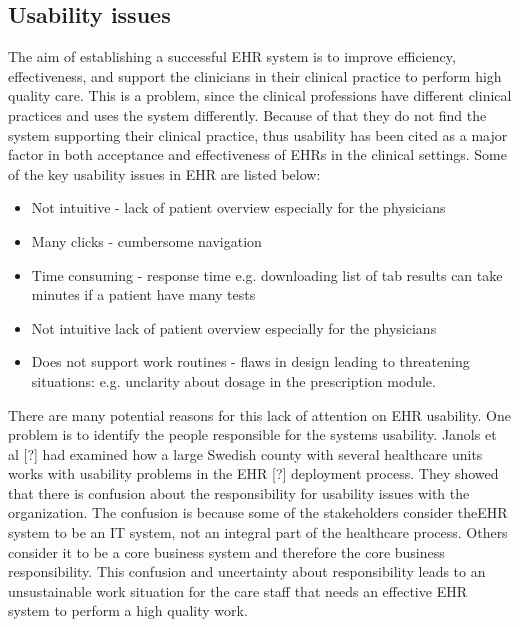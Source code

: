 \documentclass[14pt]{article}
\begin{document}
\subsection{Usability issues}
The aim of establishing a successful \gls{EHR} system is to improve efficiency, effectiveness, and support the clinicians in their clinical practice to perform high quality care. This is a problem, since the clinical professions have different clinical practices and uses the system differently. Because of that they do not find the system supporting their clinical practice, thus usability has been cited as a major factor in both acceptance and effectiveness of  \gls{EHR}s in the clinical settings. Some of the key usability issues in EHR are listed below:
\begin{itemize}
\item Not intuitive -  lack of patient overview especially for the physicians
\item Many clicks  - cumbersome navigation
\item Time consuming - response time e.g. downloading list of tab results can take minutes if a patient have many tests
\item Not intuitive  lack of patient overview especially for the physicians
\item Does not support work routines - flaws in design leading to threatening situations:  e.g. unclarity about dosage in the  prescription module.
\end{itemize}

There are many potential reasons for this lack of attention on \gls{EHR} usability. One problem is to identify the people responsible for the systems usability. Janols et al [?] had examined how a large Swedish county with several healthcare units works with usability problems in the \gls{EHR} [?] deployment process. They showed that there is confusion about the responsibility for usability issues with the organization. The confusion is because some of the stakeholders consider the\gls{EHR} system to be an IT system, not an integral part of the healthcare process. Others consider it to be a core business system and therefore the core business responsibility. This confusion and uncertainty about responsibility leads to an unsustainable work situation for the care staff that needs an effective \gls{EHR} system to perform a high quality work.
\end{document}
